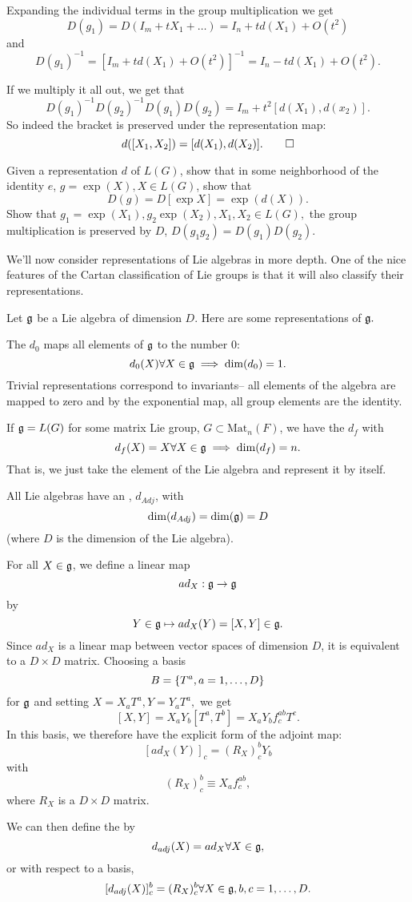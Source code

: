 Expanding the individual terms in the group multiplication we get
$$D(g_1)=D(I_m+tX_1+\ldots)=I_n+t d(X_1)+O(t^2)$$
and
$$D(g_1)^{-1}=[I_m+td(X_1)+O(t^2)]^{-1}=I_n-td(X_1)+O(t^2).$$

If we multiply it all out, we get that
$$D(g_1)^{-1}D(g_2)^{-1}D(g_1)D(g_2)=I_m+t^2[d(X_1),d(x_2)].$$
So indeed the bracket is preserved under the representation map:
$$d([X_1,X_2])=[d(X_1),d(X_2)].\qed$$

\begin{ex}%
Given a representation $d$ of $L(G)$, show that in some neighborhood of the identity $e$, $g=\exp(X),X\in L(G)$, show that
$$D(g)=D[\exp X] = \exp(d(X)).$$
Show that $g_1=\exp (X_1), g_2 \exp(X_2), X_1,X_2\in L(G),$ the group multiplication is preserved by $D$, $D(g_1g_2)=D(g_1)D(g_2).$
\end{ex}

We'll now consider representations of Lie algebras in more depth. One of the nice features of the Cartan classification of Lie groups is that it will also classify their representations.

Let $\mathfrak{g}$ be a Lie algebra of dimension $D$. Here are some representations of $\mathfrak{g}.$
\begin{defn}
The  $d_0$ maps all elements of $\mathfrak{g}$ to the number $0$:
$$d_0(X)\forall X\in \mathfrak{g} \implies \dim(d_0)=1.$$
Trivial representations correspond to invariants-- all elements of the algebra are mapped to zero and by the exponential map, all group elements are the identity.
\end{defn}
\begin{defn}
If $\mathfrak{g}=L(G)$ for some matrix Lie group, $G\subset \text{Mat}_n(F)$, we have the  $d_f$ with
$$d_f(X)=X\forall X\in \mathfrak{g} \implies \dim(d_f)=n.$$
That is, we just take the element of the Lie algebra and represent it by itself.
\end{defn}
\begin{defn}
All Lie algebras have an , $d_{Adj}$, with
$$\dim(d_{Adj})=\dim(\mathfrak{g})=D$$
(where $D$ is the dimension of the Lie algebra).

For all $X\in \mathfrak{g}$, we define a linear map
$$ad_X:\mathfrak{g} \to \mathfrak{g}$$
by
$$Y\in \mathfrak{g} \mapsto ad_X(Y) = [X,Y]\in \mathfrak{g}.$$
Since $ad_X$ is a linear map between vector spaces of dimension $D$, it is equivalent to a $D\times D$ matrix. Choosing a basis
$$B=\{T^a,a=1,\ldots,D\}$$
for $\mathfrak{g}$ and setting
$X=X_a T^a, Y=Y_a T^a,$
we get
$$ [X,Y]=X_a Y_b [T^a,T^b]=X_a Y_b f^{ab}_c T^c.$$
In this basis, we therefore have the explicit form of the adjoint map:
$$[ad_X(Y)]_c=(R_X)^b_c Y_b$$
with
$$(R_X)^b_c \equiv X_a f^{ab}_c,$$
where $R_X$ is a $D\times D$ matrix.

We can then define the  by
$$d_{adj}(X)=ad_X \forall X\in \mathfrak{g},$$
or with respect to a basis,
$$[d_{adj}(X)]^b_c = (R_X)^b_c \forall X\in \mathfrak{g}, b,c=1,\ldots, D.$$
\end{defn}

